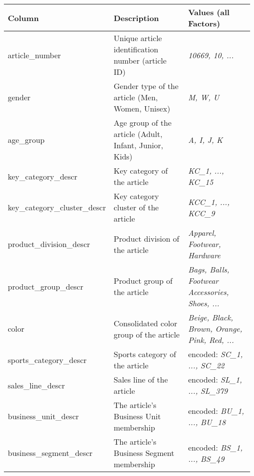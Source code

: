 \begin{table}[H]
\setlength\arrayrulewidth{1pt}  
\centering
\begin{adjustbox}{max width=\textwidth}
\begin{tabular}{|l|l|l|}
\hline
\rowcolor{lightgray}
\textbf{Column}           & \textbf{Description}                                   & \textbf{Values (all Factors)}                 \\ \hline
article\_number           & Unique article identification number (article ID)      & \textit{10669, 10, ...}                                \\ \hline
gender                    & Gender type of the article (Men, Women, Unisex)        & \textit{M, W, U}                                       \\ \hline
age\_group                & Age group of the article (Adult, Infant, Junior, Kids) & \textit{A, I, J, K}                                    \\ \hline
key\_category\_descr      & Key category of the article & \textit{KC\_1, ..., KC\_15}   \\ \hline
key\_category\_cluster\_descr      & Key category cluster of the article & \textit{KCC\_1, ..., KCC\_9}   \\ \hline
product\_division\_descr  & Product division of the article                        & \textit{Apparel, Footwear, Hardware}                   \\ \hline
product\_group\_descr     & Product group of the article                           & \textit{Bags, Balls, Footwear Accessories, Shoes, ...} \\ \hline
color                     & Consolidated color group of the article                & \textit{Beige, Black, Brown, Orange, Pink, Red, ... }  \\ \hline
sports\_category\_descr   & Sports category of the article                         & encoded: \textit{SC\_1, ..., SC\_22 }                  \\ \hline
sales\_line\_descr        & Sales line of the article                              & encoded: \textit{SL\_1, ..., SL\_379 }                 \\ \hline
business\_unit\_descr     & The article's Business Unit membership                 & encoded:\textit{ BU\_1, ..., BU\_18   }                \\ \hline
business\_segment\_descr  & The article's Business Segment membership              & encoded: \textit{BS\_1, ..., BS\_49  }                 \\ \hline

\end{tabular}
\end{adjustbox}
\end{table}
